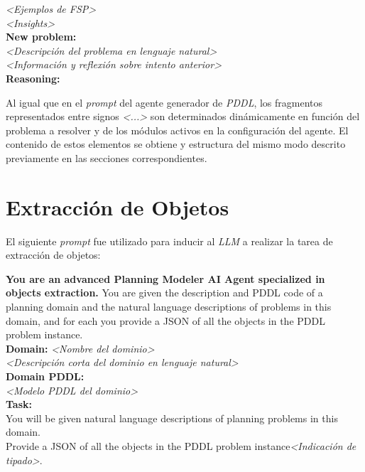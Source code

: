 \begin{anexes}
\begin{tcolorbox}[colback=gray!10!white, colframe=black, title=\textit{Prompt} del agente de razonamiento, fonttitle=\bfseries, breakable]
\textit{<Ejemplos de FSP>}\\

\textit{<Insights>}\\

\textbf{New problem:} \\
\textit{<Descripción del problema en lenguaje natural>}\\

\textit{<Información y reflexión sobre intento anterior>}\\

\textbf{Reasoning:}
\end{tcolorbox}

Al igual que en el \textit{prompt} del agente generador de \textit{PDDL}, los fragmentos representados entre signos \textit{<...>} son determinados dinámicamente en función del problema a resolver y de los módulos activos en la configuración del agente. El contenido de estos elementos se obtiene y estructura del mismo modo descrito previamente en las secciones correspondientes.

\section*{Extracción de Objetos}

El siguiente \textit{prompt} fue utilizado para inducir al \textit{LLM} a realizar la tarea de extracción de objetos:

\begin{tcolorbox}[colback=gray!10!white, colframe=black, title=\textit{Prompt} del agente de extracción de objetos, fonttitle=\bfseries, breakable]
\textbf{You are an advanced Planning Modeler AI Agent specialized in objects extraction.} You are given the description and PDDL code of a planning domain and the natural language descriptions of problems in this domain, and for each you provide a JSON of all the objects in the PDDL problem instance.\\

\textbf{Domain:} \textit{<Nombre del dominio>} \\
\textit{<Descripción corta del dominio en lenguaje natural>}\\

\textbf{Domain PDDL:} \\
\textit{<Modelo PDDL del dominio>}\\

\textbf{Task:} \\
You will be given natural language descriptions of planning problems in this domain. \\
Provide a JSON of all the objects in the PDDL problem instance\textit{<Indicación de tipado>}.\\


\end{tcolorbox}
\end{anexes}
